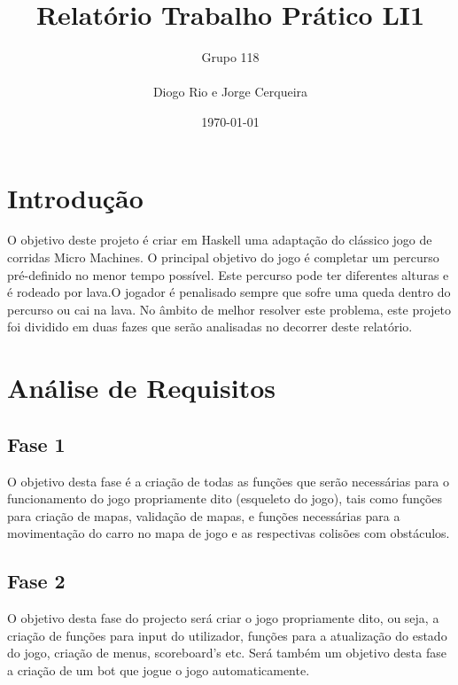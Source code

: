 \documentclass[a4paper]{report} %
\begin{document}
\title{Relatório Trabalho Prático LI1}
\author{Grupo 118\\
\\
Diogo Rio e  Jorge Cerqueira}
\date{\today}

\maketitle

\tableofcontents

\listoffigures

\chapter{Introdução}

O objetivo deste projeto é criar em Haskell uma adaptação do clássico jogo de corridas Micro Machines. O principal objetivo do jogo é completar um percurso pré-definido no menor tempo possível. Este percurso pode ter diferentes alturas e é rodeado por lava.O jogador é penalisado sempre que sofre uma queda dentro do percurso ou cai na lava.
No âmbito de melhor resolver este problema, este projeto foi dividido em duas fazes que serão analisadas no decorrer deste relatório.

\chapter{Análise de Requisitos}


\section{Fase 1}
\label{sec:analisefase1}

O objetivo desta fase é a criação de todas as funções que serão necessárias para o funcionamento do jogo propriamente dito (esqueleto do jogo), tais como funções para criação de mapas, validação de mapas, e funções necessárias para a movimentação do carro no mapa de jogo e as respectivas colisões com obstáculos.


\section{Fase 2}
\label{sec:analisefasee}

O objetivo desta fase do projecto será criar o jogo propriamente dito, ou seja, a criação de funções para input do utilizador, funções para a atualização do estado do jogo, criação de menus, scoreboard's etc. Será também um objetivo desta fase a criação de um bot que jogue o jogo automaticamente.
\end{document}
